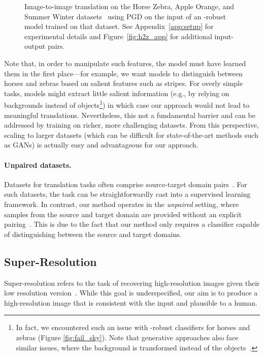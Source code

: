 \documentclass{article}
\newcommand{\HtoZ}{Horse  Zebra}
\newcommand{\StoW}{Summer  Winter}
\newcommand{\AtoO}{Apple  Orange}
\begin{document}
{\begin{figure}[htp]
\begin{center}
    \end{center}
    \caption{Image-to-image translation on the {\HtoZ}, {\AtoO},
    and {\StoW} datasets~\cite{zhu2017unpaired} using PGD on the input of an
    -robust model trained on that dataset.
    See Appendix~\ref{app:setup} for experimental details and 
    Figure~\ref{fig:h2z_app} for additional input-output pairs.}
    \label{fig:h2z}
\end{figure}

Note that, in order to manipulate such features, the model must have learned
them in the first place---for example, we want models to distinguish between
horses and zebras based on salient features such as stripes. For overly simple
 tasks, models might extract little
salient information (e.g., by relying on backgrounds instead of objects\footnote{In
    fact, we encountered such an issue with -robust classifiers for
horses and zebras (Figure \ref{fig:fail_sky}). Note that generative
approaches also face similar issues, where the background is transformed instead
of the objects~\citep{zhu2017unpaired}.})
in which case our approach would not lead to meaningful translations.
Nevertheless, this not a fundamental barrier and
can be addressed by training on richer, more challenging datasets.
From this perspective, scaling to larger datasets (which can be difficult for
state-of-the-art methods such as GANs) is actually easy and advantageous for our approach.

\paragraph{Unpaired datasets.} Datasets for translation tasks
often comprise source-target domain pairs~\cite{isola2017image}.
For such datasets, the task can be straightforwardly cast into a supervised
learning framework.
In contrast, our method operates in the {\em unpaired} setting, where
samples from the source and target domain are provided without an
explicit pairing~\cite{zhu2017unpaired}.
This is due to the fact that our method only requires a classifier capable
of distinguishing between the source and target domains.
 
\subsection{Super-Resolution}
\label{sec:superresolution}
Super-resolution refers to the task of recovering high-resolution images given 
their low resolution version~\cite{dabov2007video,burger2012image}.
While this goal is underspecified, our aim is
to produce a high-resolution image that is consistent with the input and
plausible to a human. 

}
\end{document}
